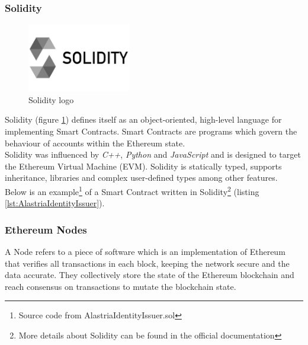 \documentclass[a4paper, 12pt]{article} %
\begin{document}
        \subsubsection{Solidity}
            \begin{figure}[h]
                \centering
                \includegraphics[width=0.4\textwidth]{solidity-logo.jpg}
                \caption{Solidity logo}
                \label{fig:solidity_logo}
            \end{figure}
            
            Solidity (figure \ref{fig:solidity_logo}) defines itself as an object-oriented, high-level language for implementing Smart Contracts. Smart Contracts are programs which govern the behaviour of accounts within the Ethereum state.\\
            
            Solidity\cite{solidityGit} was influenced by \textit{C++}, \textit{Python} and \textit{JavaScript} and is designed to target the Ethereum Virtual Machine (EVM). Solidity is statically typed, supports inheritance, libraries and complex user-defined types among other features.\\

            Below is an example\footnote{Source code from AlastriaIdentityIssuer.sol\cite{AlastriaIdentityIssuer}}
 of a Smart Contract written in Solidity\footnote{More details about Solidity can be found in the official documentation\cite{solidity}} (listing  \ref{lst:AlastriaIdentityIssuer}).
            
            

        \subsubsection{Ethereum Nodes}
            A Node refers to a piece of software which is an implementation of Ethereum that verifies all transactions in each block, keeping the network secure and the data accurate. They collectively store the state of the Ethereum blockchain and reach consensus on transactions to mutate the blockchain state.\\
            
\end{document}
